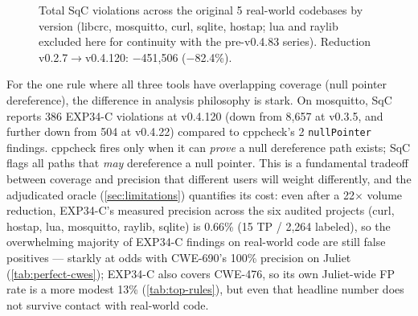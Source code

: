 \begin{figure}[t]
\centering
{}
\caption{Total SqC violations across the original 5 real-world
codebases by version (libcrc, mosquitto, curl, sqlite, hostap; lua and
raylib excluded here for continuity with the pre-v0.4.83 series).
Reduction v0.2.7$\to$v0.4.120: $-$451,506 ($-$82.4\%).}
\label{fig:realworld-reduction}
\end{figure}

For the one rule where all three tools have overlapping coverage
(null pointer dereference), the difference in analysis philosophy is
stark.  On mosquitto, SqC reports 386 EXP34-C violations at v0.4.120
(down from 8,657 at v0.3.5, and further down from 504 at v0.4.22)
compared to cppcheck's 2 \texttt{nullPointer} findings.  cppcheck fires
only when it can \emph{prove} a null dereference path exists; SqC flags
all paths that \emph{may} dereference a null pointer.  This is a
fundamental tradeoff between coverage and precision that different
users will weight differently, and the adjudicated oracle
(\cref{sec:limitations}) quantifies its cost: even after a
22$\times$ volume reduction, EXP34-C's measured precision across the
six audited projects (curl, hostap, lua, mosquitto, raylib, sqlite) is
0.66\% (15 TP / 2{,}264 labeled), so the overwhelming majority of
EXP34-C findings on real-world code are still false positives ---
starkly at odds with CWE-690's 100\% precision on Juliet
(\cref{tab:perfect-cwes}); EXP34-C also covers CWE-476, so its own
Juliet-wide FP rate is a more modest 13\% (\cref{tab:top-rules}), but
even that headline number does not survive contact with real-world
code.

